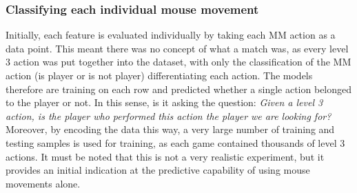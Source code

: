 \documentclass[Report.tex]{subfiles}
\begin{document}
\subsubsection{Classifying each individual mouse movement}
Initially, each feature is evaluated individually by taking each MM action as a data point. This meant there was no concept of what a match was, as every level 3 action was put together into the dataset, with only the classification of the MM action (is player or is not player) differentiating each action. The models therefore are training on each row and predicted whether a single action belonged to the player or not. In this sense, is it asking the question: \textit{Given a level 3 action, is the player who performed this action the player we are looking for?} Moreover, by encoding the data this way, a very large number of training and testing samples is used for training, as each game contained thousands of level 3 actions. It must be noted that this is not a very realistic experiment, but it provides an initial indication at the predictive capability of using mouse movements alone.
\newcommand{\newaxis}[4]{
\begin{axis}[
    ybar,
    title={#1},
    ymin=#3, ymax=#4,
    bar width=1em,
    legend style={at={(0.5,-0.25)},anchor=north,legend columns=-1},
    enlarge x limits=0.4,
    x tick label style={align=center,text width=1.7cm},
    symbolic x coords={Logistic Regression, Random Forest, Multi-layer Perceptron},
    xtick=data,
    ylabel={#2}
]
} 
\end{document}

